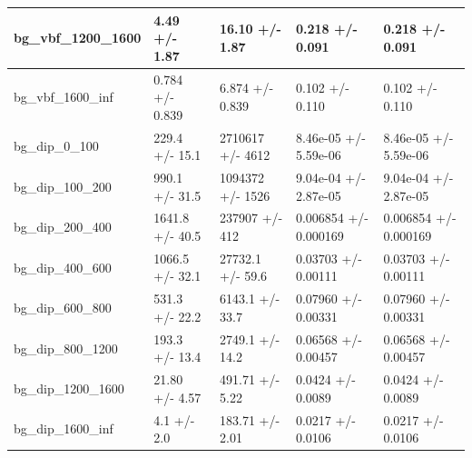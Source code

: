 \documentclass[a4paper, 10pt]{article}
\begin{document}
\begin{table}[H]
\begin{center}
\begin{tabular}{|m{20.0mm}|m{27.0mm}|m{27.0mm}|m{33.0mm}|m{32.0mm}|}
      \hline
      {\cellcolor{white}         bg\_vbf\_1200\_1600}& {\cellcolor{white}         4.49 +/\-- 1.87}& {\cellcolor{white}         16.10 +/\-- 1.87}& {\cellcolor{white}         0.218 +/\-- 0.091}& {\cellcolor{white}         0.218 +/\-- 0.091}\\
      \hline
      {\cellcolor{white}         bg\_vbf\_1600\_inf}& {\cellcolor{white}         0.784 +/\-- 0.839}& {\cellcolor{white}         6.874 +/\-- 0.839}& {\cellcolor{white}         0.102 +/\-- 0.110}& {\cellcolor{white}         0.102 +/\-- 0.110}\\
      \hline
      {\cellcolor{white}         bg\_dip\_0\_100}& {\cellcolor{white}         229.4 +/\-- 15.1}& {\cellcolor{white}         2710617 +/\-- 4612}& {\cellcolor{white}         8.46e-05 +/\-- 5.59e-06}& {\cellcolor{white}         8.46e-05 +/\-- 5.59e-06}\\
      \hline
      {\cellcolor{white}         bg\_dip\_100\_200}& {\cellcolor{white}         990.1 +/\-- 31.5}& {\cellcolor{white}         1094372 +/\-- 1526}& {\cellcolor{white}         9.04e-04 +/\-- 2.87e-05}& {\cellcolor{white}         9.04e-04 +/\-- 2.87e-05}\\
      \hline
      {\cellcolor{white}         bg\_dip\_200\_400}& {\cellcolor{white}         1641.8 +/\-- 40.5}& {\cellcolor{white}         237907 +/\-- 412}& {\cellcolor{white}         0.006854 +/\-- 0.000169}& {\cellcolor{white}         0.006854 +/\-- 0.000169}\\
      \hline
      {\cellcolor{white}         bg\_dip\_400\_600}& {\cellcolor{white}         1066.5 +/\-- 32.1}& {\cellcolor{white}         27732.1 +/\-- 59.6}& {\cellcolor{white}         0.03703 +/\-- 0.00111}& {\cellcolor{white}         0.03703 +/\-- 0.00111}\\
      \hline
      {\cellcolor{white}         bg\_dip\_600\_800}& {\cellcolor{white}         531.3 +/\-- 22.2}& {\cellcolor{white}         6143.1 +/\-- 33.7}& {\cellcolor{white}         0.07960 +/\-- 0.00331}& {\cellcolor{white}         0.07960 +/\-- 0.00331}\\
      \hline
      {\cellcolor{white}         bg\_dip\_800\_1200}& {\cellcolor{white}         193.3 +/\-- 13.4}& {\cellcolor{white}         2749.1 +/\-- 14.2}& {\cellcolor{white}         0.06568 +/\-- 0.00457}& {\cellcolor{white}         0.06568 +/\-- 0.00457}\\
      \hline
      {\cellcolor{white}         bg\_dip\_1200\_1600}& {\cellcolor{white}         21.80 +/\-- 4.57}& {\cellcolor{white}         491.71 +/\-- 5.22}& {\cellcolor{white}         0.0424 +/\-- 0.0089}& {\cellcolor{white}         0.0424 +/\-- 0.0089}\\
      \hline
      {\cellcolor{white}         bg\_dip\_1600\_inf}& {\cellcolor{white}         4.1 +/\-- 2.0}& {\cellcolor{white}         183.71 +/\-- 2.01}& {\cellcolor{white}         0.0217 +/\-- 0.0106}& {\cellcolor{white}         0.0217 +/\-- 0.0106}\\
\hline
    \end{tabular}
  \end{center}
\end{table}
\end{document}
